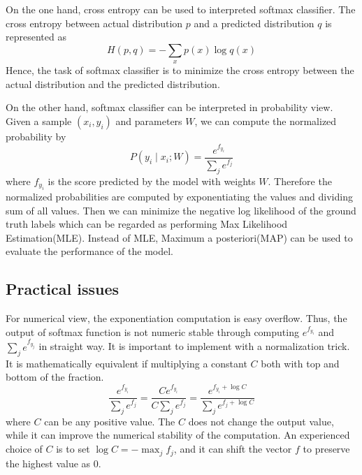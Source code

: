 On the one hand, cross entropy can be used to interpreted softmax classifier. The cross entropy between actual  distribution $p$ and a predicted distribution $q$ is represented as
\begin{equation}\label{eq:CrossEntropyDiff}
H(p,q) = - \sum_x p(x) \log q(x)
\end{equation}
Hence, the task of softmax classifier is to minimize the cross entropy between the actual distribution and the predicted distribution. 

On the other hand, softmax classifier can be interpreted in probability view. Given a sample $(x_i, y_i)$ and parameters $W$, we can compute the normalized probability by
\begin{equation}\label{eq:ProbInter}
P(y_i \mid x_i; W) = \frac{e^{f_{y_i}}}{\sum_j e^{f_j} }
\end{equation}
where $f_{y_i}$ is the score predicted by the model with weights $W$. Therefore the normalized probabilities are computed by exponentiating the values and dividing sum of all values. Then we can minimize the negative log likelihood of the ground truth labels which can be regarded as performing Max Likelihood Estimation(MLE). Instead of MLE, Maximum a posteriori(MAP) can be used to evaluate the performance of the model.

\subsection{Practical issues}

For numerical view, the exponentiation computation is easy overflow. Thus, the output of softmax function is not numeric stable through computing $e^{f_{y_i}}$ and $\sum_j e^{f_{y_j}}$ in straight way. It is important to implement with a normalization trick. It is mathematically equivalent if multiplying a constant $C$ both with top and bottom of the fraction.
\begin{equation}\label{eq:SoftmaxTricks}
\frac{e^{f_{y_i}}}{\sum_j e^{f_j}}
= \frac{Ce^{f_{y_i}}}{C\sum_j e^{f_j}}
= \frac{e^{f_{y_i} + \log C}}{\sum_j e^{f_j + \log C}}
\end{equation}
where $C$ can be any positive value. The $C$ does not change the output value, while it can improve the numerical stability of the computation. An experienced choice of $C$ is to set $\log C = -\max_j f_j$, and it can shift the vector $f$ to preserve the highest value as $0$.

